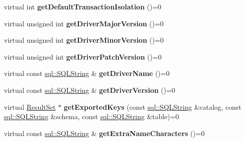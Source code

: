 \begin{DoxyCompactItemize}
\hypertarget{classsql_1_1_database_meta_data_ae9b4fc386b1fcef9bfc0f32770c1d915}{}\label{classsql_1_1_database_meta_data_ae9b4fc386b1fcef9bfc0f32770c1d915} 
virtual int {\bfseries get\+Default\+Transaction\+Isolation} ()=0
\item 
\hypertarget{classsql_1_1_database_meta_data_adf24b72cd1494ea9d0eac347b9d27eeb}{}\label{classsql_1_1_database_meta_data_adf24b72cd1494ea9d0eac347b9d27eeb} 
virtual unsigned int {\bfseries get\+Driver\+Major\+Version} ()=0
\item 
\hypertarget{classsql_1_1_database_meta_data_a0aca6126dccab168a8f80a37ee981572}{}\label{classsql_1_1_database_meta_data_a0aca6126dccab168a8f80a37ee981572} 
virtual unsigned int {\bfseries get\+Driver\+Minor\+Version} ()=0
\item 
\hypertarget{classsql_1_1_database_meta_data_a61bd3f4abd44b3881298d134a5eb3e23}{}\label{classsql_1_1_database_meta_data_a61bd3f4abd44b3881298d134a5eb3e23} 
virtual unsigned int {\bfseries get\+Driver\+Patch\+Version} ()=0
\item 
\hypertarget{classsql_1_1_database_meta_data_af4ca8e69a8eeb1d8c1e8e7ddf9c4275b}{}\label{classsql_1_1_database_meta_data_af4ca8e69a8eeb1d8c1e8e7ddf9c4275b} 
virtual const \hyperlink{classsql_1_1_s_q_l_string}{sql\+::\+S\+Q\+L\+String} \& {\bfseries get\+Driver\+Name} ()=0
\item 
\hypertarget{classsql_1_1_database_meta_data_a62c128d6c9518f3d4d72cb428b08f915}{}\label{classsql_1_1_database_meta_data_a62c128d6c9518f3d4d72cb428b08f915} 
virtual const \hyperlink{classsql_1_1_s_q_l_string}{sql\+::\+S\+Q\+L\+String} \& {\bfseries get\+Driver\+Version} ()=0
\item 
\hypertarget{classsql_1_1_database_meta_data_aa3c0a69a0cdaf26d9aec3e8e9353660b}{}\label{classsql_1_1_database_meta_data_aa3c0a69a0cdaf26d9aec3e8e9353660b} 
virtual \hyperlink{classsql_1_1_result_set}{Result\+Set} $\ast$ {\bfseries get\+Exported\+Keys} (const \hyperlink{classsql_1_1_s_q_l_string}{sql\+::\+S\+Q\+L\+String} \&catalog, const \hyperlink{classsql_1_1_s_q_l_string}{sql\+::\+S\+Q\+L\+String} \&schema, const \hyperlink{classsql_1_1_s_q_l_string}{sql\+::\+S\+Q\+L\+String} \&table)=0
\item 
\hypertarget{classsql_1_1_database_meta_data_ad69fbdc5f394fdcc273478918733d773}{}\label{classsql_1_1_database_meta_data_ad69fbdc5f394fdcc273478918733d773} 
virtual const \hyperlink{classsql_1_1_s_q_l_string}{sql\+::\+S\+Q\+L\+String} \& {\bfseries get\+Extra\+Name\+Characters} ()=0
\item 
\hypertarget{classsql_1_1_database_meta_data_af7346d0eb62559c73c3f10610b662b29}{}\label{classsql_1_1_database_meta_data_af7346d0eb62559c73c3f10610b662b29} 

\end{DoxyCompactItemize}

